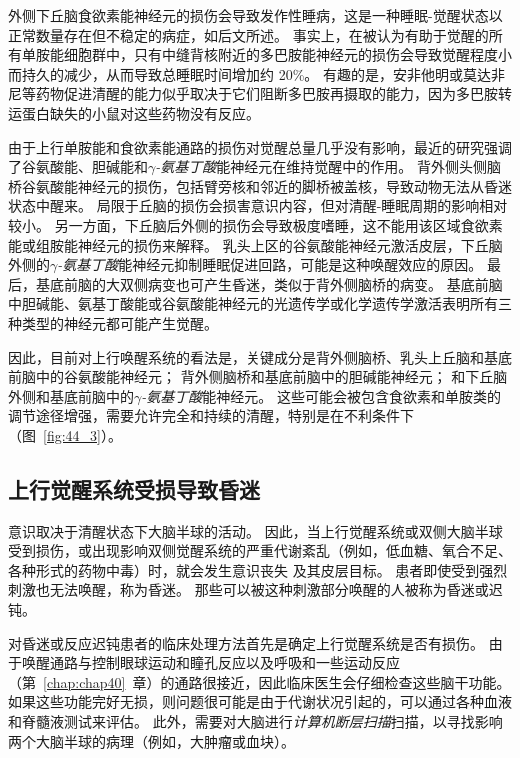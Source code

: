 外侧下丘脑食欲素能神经元的损伤会导致发作性睡病，这是一种睡眠-觉醒状态以正常数量存在但不稳定的病症，如后文所述。
事实上，在被认为有助于觉醒的所有单胺能细胞群中，只有中缝背核附近的多巴胺能神经元的损伤会导致觉醒程度小而持久的减少，从而导致总睡眠时间增加约 20\%。
有趣的是，安非他明或莫达非尼等药物促进清醒的能力似乎取决于它们阻断多巴胺再摄取的能力，因为多巴胺转运蛋白缺失的小鼠对这些药物没有反应。


由于上行单胺能和食欲素能通路的损伤对觉醒总量几乎没有影响，最近的研究强调了谷氨酸能、胆碱能和\textit{$\gamma$-氨基丁酸}能神经元在维持觉醒中的作用。
背外侧头侧脑桥谷氨酸能神经元的损伤，包括臂旁核和邻近的脚桥被盖核，导致动物无法从昏迷状态中醒来。
局限于丘脑的损伤会损害意识内容，但对清醒-睡眠周期的影响相对较小。
另一方面，下丘脑后外侧的损伤会导致极度嗜睡，这不能用该区域食欲素能或组胺能神经元的损伤来解释。
乳头上区的谷氨酸能神经元激活皮层，下丘脑外侧的\textit{$\gamma$-氨基丁酸}能神经元抑制睡眠促进回路，可能是这种唤醒效应的原因。
最后，基底前脑的大双侧病变也可产生昏迷，类似于背外侧脑桥的病变。
基底前脑中胆碱能、氨基丁酸能或谷氨酸能神经元的光遗传学或化学遗传学激活表明所有三种类型的神经元都可能产生觉醒。


因此，目前对上行唤醒系统的看法是，关键成分是背外侧脑桥、乳头上丘脑和基底前脑中的谷氨酸能神经元；
背外侧脑桥和基底前脑中的胆碱能神经元；
和下丘脑外侧和基底前脑中的\textit{$\gamma$-氨基丁酸}能神经元。
这些可能会被包含食欲素和单胺类的调节途径增强，需要允许完全和持续的清醒，特别是在不利条件下（图~\ref{fig:44_3}）。



\subsection{上行觉醒系统受损导致昏迷}

意识取决于清醒状态下大脑半球的活动。
因此，当上行觉醒系统或双侧大脑半球受到损伤，或出现影响双侧觉醒系统的严重代谢紊乱（例如，低血糖、氧合不足、各种形式的药物中毒）时，就会发生意识丧失 及其皮层目标。
患者即使受到强烈刺激也无法唤醒，称为昏迷。
那些可以被这种刺激部分唤醒的人被称为昏迷或迟钝。


对昏迷或反应迟钝患者的临床处理方法首先是确定上行觉醒系统是否有损伤。
由于唤醒通路与控制眼球运动和瞳孔反应以及呼吸和一些运动反应（第~\ref{chap:chap40}~章）的通路很接近，因此临床医生会仔细检查这些脑干功能。
如果这些功能完好无损，则问题很可能是由于代谢状况引起的，可以通过各种血液和脊髓液测试来评估。
此外，需要对大脑进行\textit{计算机断层扫描}扫描，以寻找影响两个大脑半球的病理（例如，大肿瘤或血块）。



